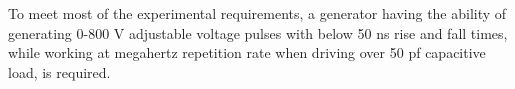 \documentclass[aip,rsi,reprint,graphicx]{revtex4-1} %
\begin{document}
 To meet most of the experimental requirements, a generator having the ability of generating 0-800 V adjustable voltage pulses with below 50 ns rise and fall times, while working at megahertz repetition rate when driving over 50 pf capacitive load, is required.
\end{document}
